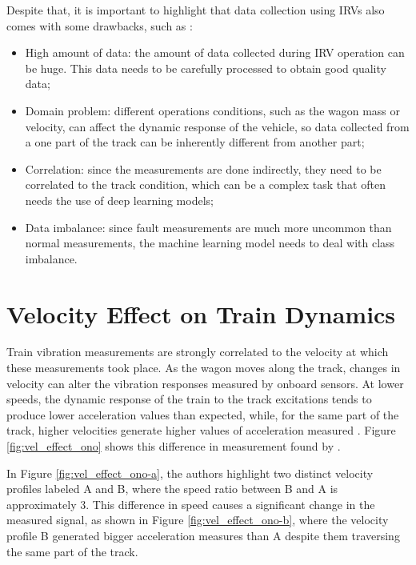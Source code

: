 Despite that, it is important to highlight that data collection using IRVs also comes with some drawbacks, such as \cite{PIRES2024107191,GHIASI2025109516}:
\begin{itemize}
    \item High amount of data: the amount of data collected during IRV operation can be huge. This data needs to be carefully processed to obtain good quality data;
    \item Domain problem: different operations conditions, such as the wagon mass or velocity, can affect the dynamic response of the vehicle, so data collected from a one part of the track can be inherently different from another part;
    \item Correlation: since the measurements are done indirectly, they need to be correlated to the track condition, which can be a complex task that often needs the use of deep learning models;
    \item Data imbalance: since fault measurements are much more uncommon than normal measurements, the machine learning model needs to deal with class imbalance.
\end{itemize}

\section{Velocity Effect on Train Dynamics} \label{sec-vel-effect-measurement}

Train vibration measurements are strongly correlated to the velocity at which these measurements took place. As the wagon moves along the track, changes in velocity can alter the vibration responses measured by onboard sensors. At lower speeds, the dynamic response of the train to the track excitations tends to produce lower acceleration values than expected, while, for the same part of the track, higher velocities generate higher values of acceleration measured \cite{Hironori_ONO202322-00239}. Figure \ref{fig:vel_effect_ono} shows this difference in measurement found by \cite{Hironori_ONO202322-00239}. 

In Figure \ref{fig:vel_effect_ono-a}, the authors highlight two distinct velocity profiles labeled A and B, where the speed ratio between B and A is approximately 3. This difference in speed causes a significant change in the measured signal, as shown in Figure \ref{fig:vel_effect_ono-b}, where the velocity profile B generated bigger acceleration measures than A despite them traversing the same part of the track. 

